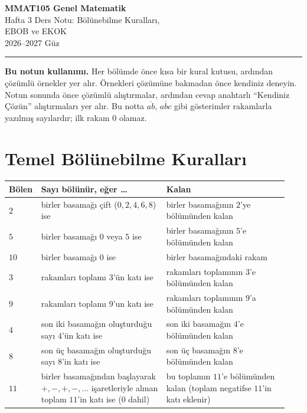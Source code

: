 \documentclass[11pt,a4paper]{article}
\newcommand{\ab}[1]{\overline{#1}}
\begin{document}
\begin{minipage}[c]{\textwidth}
{\LARGE\bfseries\color{anamavi} MMAT105 Genel Matematik}\\[4pt]
{\large Hafta 3 Ders Notu: Bölünebilme Kuralları,\\ EBOB ve EKOK}\\[6pt]
{\small 2026--2027 Güz}
\end{minipage}

\vspace{4pt}\noindent\textcolor{anamavi}{\rule{\textwidth}{1pt}}

\textbf{Bu notun kullanımı.} Her bölümde önce kısa bir kural kutusu, ardından çözümlü örnekler yer alır. Örnekleri çözümüne bakmadan önce kendiniz deneyin. Notun sonunda önce çözümlü alıştırmalar, ardından cevap anahtarlı ``Kendiniz Çözün'' alıştırmaları yer alır. Bu notta \(\ab{ab}\), \(\ab{abc}\) gibi gösterimler rakamlarla yazılmış sayılardır; ilk rakam \(0\) olamaz.

\section{Temel Bölünebilme Kuralları}

\begin{kural}
\renewcommand{\arraystretch}{1.3}
\begin{tabular}{@{}>{\raggedright\arraybackslash}p{0.07\linewidth}>{\raggedright\arraybackslash}p{0.44\linewidth}>{\raggedright\arraybackslash}p{0.43\linewidth}@{}}
\toprule
Bölen & Sayı bölünür, eğer \dots & Kalan \\\midrule
\(2\) & birler basamağı çift (\(0,2,4,6,8\)) ise & birler basamağının \(2\)'ye bölümünden kalan\\
\(5\) & birler basamağı \(0\) veya \(5\) ise & birler basamağının \(5\)'e bölümünden kalan\\
\(10\) & birler basamağı \(0\) ise & birler basamağındaki rakam\\
\(3\) & rakamları toplamı \(3\)'ün katı ise & rakamları toplamının \(3\)'e bölümünden kalan\\
\(9\) & rakamları toplamı \(9\)'un katı ise & rakamları toplamının \(9\)'a bölümünden kalan\\
\(4\) & son iki basamağın oluşturduğu sayı \(4\)'ün katı ise & son iki basamağın \(4\)'e bölümünden kalan\\
\(8\) & son üç basamağın oluşturduğu sayı \(8\)'in katı ise & son üç basamağın \(8\)'e bölümünden kalan\\
\(11\) & birler basamağından başlayarak \(+,-,+,-,\dots\) işaretleriyle alınan toplam \(11\)'in katı ise (\(0\) dahil) & bu toplamın \(11\)'e bölümünden kalan (toplam negatifse \(11\)'in katı eklenir)\\\bottomrule
\end{tabular}
\end{kural}
\end{document}
